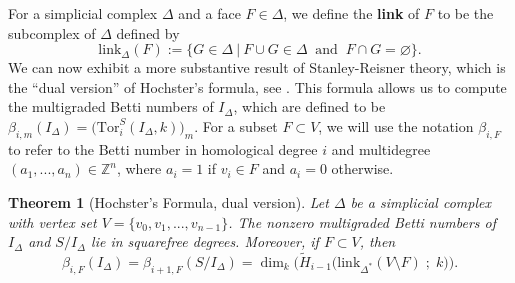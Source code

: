 \documentclass[12pt,leqno]{amsart}
\newtheorem{theorem}[lemma]{Theorem}
\theoremstyle{definition}
\begin{document}
%
For a simplicial complex $\Delta$ and a face $F \in \Delta$, we define the \textbf{link} of $F$ to be the subcomplex of $\Delta$ defined by
%
\begin{displaymath}
  \mathrm{link}_\Delta(F) := \{ G \in \Delta \ | \ F \cup G \in \Delta \ \text{ and } \ F \cap G = \varnothing \}.
\end{displaymath}
%
We can now exhibit a more substantive result of Stanley-Reisner theory, which is the ``dual version'' of Hochster's formula, see \cite[Corollary 1.40]{MS}. This formula allows us to compute the multigraded Betti numbers of $I_\Delta$, which are defined to be $\beta_{i,m}(I_\Delta) = \big( \mathrm{Tor}_i^S(I_\Delta, k) \big)_m$. For a subset $F \subset V$, we will use the notation $\beta_{i,F}$ to refer to the Betti number in homological degree $i$ and multidegree $(a_1,...,a_n) \in \mathbb Z^n$, where $a_i = 1$ if $v_i \in F$ and $a_i = 0$ otherwise.
%
\begin{theorem}[Hochster's Formula, dual version]
  Let $\Delta$ be a simplicial complex with vertex set $V = \{ v_0,v_1,...,v_{n-1} \}$. The nonzero multigraded Betti numbers of $I_\Delta$ and $S/I_\Delta$ lie in squarefree degrees. Moreover, if $F \subset V$, then
  \begin{displaymath}
    \beta_{i,F} (I_\Delta) = \beta_{i+1,F} (S/I_\Delta) = \dim_k\Big(\widetilde H_{i-1} \big( \mathrm{link}_{\Delta^*}(V \setminus F)\; ; \; k \big) \Big).
  \end{displaymath}
\end{theorem}
%
\end{document}
